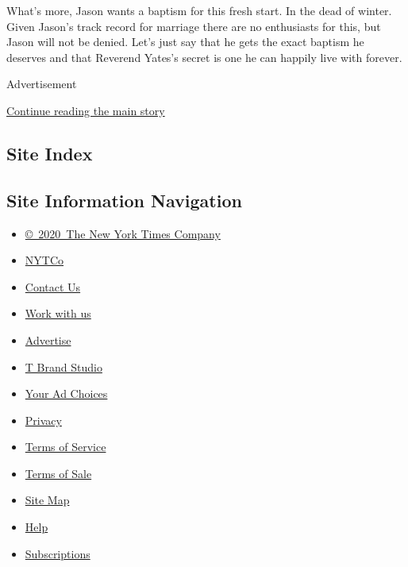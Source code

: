 What's more, Jason wants a baptism for this fresh start. In the dead of
winter. Given Jason's track record for marriage there are no enthusiasts
for this, but Jason will not be denied. Let's just say that he gets the
exact baptism he deserves and that Reverend Yates's secret is one he can
happily live with forever.

Advertisement

\protect\hyperlink{after-bottom}{Continue reading the main story}

\hypertarget{site-index}{%
\subsection{Site Index}\label{site-index}}

\hypertarget{site-information-navigation}{%
\subsection{Site Information
Navigation}\label{site-information-navigation}}

\begin{itemize}
\tightlist
\item
  \href{https://help.nytimes.com/hc/en-us/articles/115014792127-Copyright-notice}{©~2020~The
  New York Times Company}
\end{itemize}

\begin{itemize}
\tightlist
\item
  \href{https://www.nytco.com/}{NYTCo}
\item
  \href{https://help.nytimes.com/hc/en-us/articles/115015385887-Contact-Us}{Contact
  Us}
\item
  \href{https://www.nytco.com/careers/}{Work with us}
\item
  \href{https://nytmediakit.com/}{Advertise}
\item
  \href{http://www.tbrandstudio.com/}{T Brand Studio}
\item
  \href{https://www.nytimes.com/privacy/cookie-policy\#how-do-i-manage-trackers}{Your
  Ad Choices}
\item
  \href{https://www.nytimes.com/privacy}{Privacy}
\item
  \href{https://help.nytimes.com/hc/en-us/articles/115014893428-Terms-of-service}{Terms
  of Service}
\item
  \href{https://help.nytimes.com/hc/en-us/articles/115014893968-Terms-of-sale}{Terms
  of Sale}
\item
  \href{https://spiderbites.nytimes.com}{Site Map}
\item
  \href{https://help.nytimes.com/hc/en-us}{Help}
\item
  \href{https://www.nytimes.com/subscription?campaignId=37WXW}{Subscriptions}
\end{itemize}
